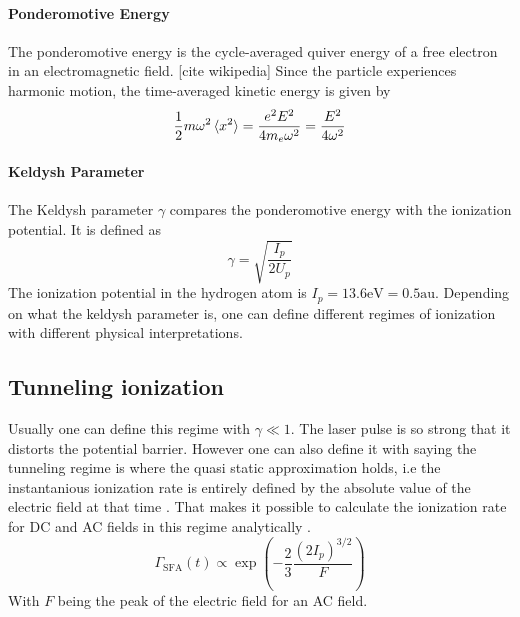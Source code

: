\paragraph{Ponderomotive Energy}
The ponderomotive energy is the cycle-averaged quiver energy of a free electron in an electromagnetic field. [cite wikipedia]
Since the particle experiences harmonic motion, the time-averaged kinetic energy is given by 
\begin{equation*}
    \frac{1}{2}m\omega^2 \braket{x^2}=\frac{e^2E^2}{4m_e\omega^2} = \frac{E^2}{4\omega^2}
\end{equation*}

\paragraph{Keldysh Parameter}
The Keldysh parameter $\gamma$ compares the ponderomotive energy with the ionization potential. 
It is defined as
\begin{equation*}
    \gamma = \sqrt{\frac{I_p}{2U_p}}
\end{equation*}
The ionization potential in the hydrogen atom is $I_p = 13.6\mathrm{eV} = 0.5 \mathrm{au.}$
Depending on what the keldysh parameter is, one can define different regimes of ionization with different physical interpretations.



\subsection{Tunneling ionization}
Usually one can define this regime with $\gamma \ll 1$.
The laser pulse is so strong that it distorts the potential barrier.
However one can also define it with saying the tunneling regime is where the quasi static approximation holds, i.e the instantanious ionization rate is entirely defined by the absolute value of the electric field at that time \cite{manorammasterthesis}. 
That makes it possible to calculate the ionization rate for DC and AC fields in this regime analytically \cite{tunnel_ion_complexatoms}. 
\begin{equation*}
    \Gamma_{\mathrm{SFA}}(t) \propto \exp\left(-\frac{2}{3}\frac{(2I_p)^{3/2}}{F}\right)
\end{equation*}
With $F$ being the peak of the electric field for an AC field. 




